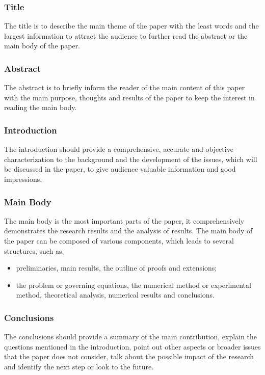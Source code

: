 \subsubsection{Title}
The title is to describe the main theme of the paper with the least words and the largest information to attract the audience to further read the abstract or the main body of the paper.

\subsubsection{Abstract}
The abstract is to briefly inform the reader of the main content of this paper with the main purpose, thoughts and results of the paper to keep the interest in reading the main body.

\subsubsection{Introduction}
The introduction should provide a comprehensive, accurate and objective characterization to the background and the development of the issues, which will be discussed in the paper, to give audience valuable information and good impressions.

\subsubsection{Main Body}
The main body is the most important parts of the paper, it comprehensively demonstrates the research results and the analysis of results. The main body of the paper can be composed of various components, which leads to several structures, such as,
\begin{itemize}
	\item preliminaries, main results, the outline of proofs and extensions;
	\item the problem or governing equations, the numerical method or experimental method, theoretical analysis, numerical results and conclusions.
\end{itemize}

\subsubsection{Conclusions}
The conclusions should provide a summary of the main contribution, explain the questions mentioned in the introduction, point out other aspects or broader issues that the paper does not consider, talk about the possible impact of the research and identify the next step or look to the future.

